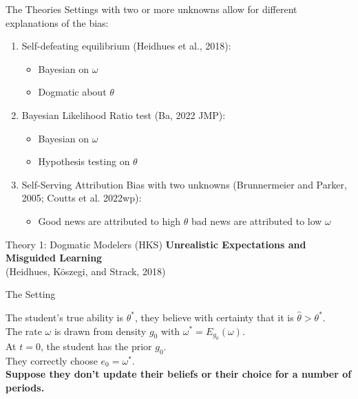 \documentclass[aspectratio=169]{beamer}
\begin{document}
\begin{frame}{The Theories}
Settings with two or more unknowns allow for different explanations of the bias:\\
\bigskip
\begin{enumerate}
\item Self-defeating equilibrium (Heidhues et al., 2018): 
    \begin{itemize}
        \item Bayesian on $\omega$
        \item Dogmatic about $\theta$
        
    \end{itemize}
    \bigskip
    \item Bayesian Likelihood Ratio test (Ba, 2022 JMP):
    \begin{itemize}
        \item Bayesian on $\omega$ 
        \item Hypothesis testing on $\theta$
    \end{itemize}
    \bigskip
    \item Self-Serving Attribution Bias with two unknowns (Brunnermeier and Parker, 2005; Coutts et al. 2022wp): 
    \begin{itemize}
        \item Good news are attributed to high $\theta$ bad news are attributed to low $\omega$
    \end{itemize}
    
    
    
\end{enumerate}
\end{frame} 

\begin{frame}{Theory 1: Dogmatic Modelers (HKS)}
    \Large\textbf{Unrealistic Expectations and Misguided Learning \\}
    (Heidhues, Köszegi, and Strack, 2018)
\end{frame}

\begin{frame}{The Setting}

The student's true ability is $\theta^*$, they believe with certainty that it is $\hat\theta>\theta^*.$ \\
\bigskip
The rate $\omega$ is drawn from density $g_0$ with $\omega^*=E_{g_0}(\omega).$\\

\bigskip
At $t=0$, the student has the prior $g_0.$\\
\bigskip
They correctly choose $e_0 = \omega^*.$\\
\bigskip
\pause
\textbf{Suppose they don't update their beliefs or their choice for a number of periods.}
\end{frame}
\end{document}
